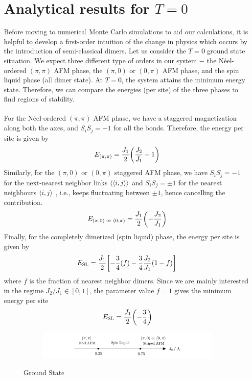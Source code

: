 \documentclass[../thesis_main.tex]{subfiles}
\begin{document}
\section{Analytical results for $T=0$} \label{t=0}
Before moving to numerical Monte Carlo simulations to aid our calculations, it is helpful to develop a first-order intuition of the change in physics which occurs by the introduction of semi-classical dimers.
Let us consider the $T = 0$ ground state situation. We expect three different type of orders in our system $-$ the Néel-ordered $(\pi, \pi)$ AFM phase, the $(\pi, 0)$ or $(0, \pi)$ AFM phase, and the spin liquid phase (all dimer state). At $T = 0$, the system attains the minimum energy state. Therefore, we can compare the energies (per site) of the three phases to find regions of stability.~\\~\\
For the Néel-ordered $(\pi, \pi)$ AFM phase, we have a staggered magnetization along both the axes, and $S_i S_j = - 1$ for all the bonds. Therefore, the energy per site is given by
\begin{equation}
    E_{(\pi, \pi)} = \frac{J_1}{2} \qty(\frac{J_2}{J_1} - 1)
\end{equation}
Similarly, for the $(\pi, 0)$ or $(0, \pi)$ staggered AFM phase, we have $S_i S_j = -1$ for the next-nearest neighbor links $\expval{\expval{i, j}}$ and $S_i S_j = \pm 1$ for the nearest neighbours $\expval{i, j}$ , i.e., keeps fluctuating between $\pm 1$, hence cancelling the contribution.
\begin{equation}
    E_{(\pi, 0) \text{ or } (0, \pi)} = \frac{J_1}{2}\qty(-\frac{J_2}{J_1})
\end{equation} 
Finally, for the completely dimerized (spin liquid) phase, the energy per site is given by
\begin{equation*}
    E_{\text{SL}} = \frac{J_1}{2} \qty[-\frac{3}{4}(f) - \frac{3}{4}\frac{J_2}{J_1}(1-f)]
\end{equation*}
where $f$ is the fraction of nearest neighbor dimers. Since we are mainly interested in the regime $J_2/J_1 \in [0, 1]$, the parameter value $f = 1$ gives the minimum energy per site
\begin{equation}
    E_{\text{SL}} = \frac{J_1}{2} \qty(-\frac{3}{4})
\end{equation}
\begin{figure}[t!]
    \centering
    \begin{subfigure}[b]{1.0\textwidth}  %
        \begin{center}
            \includegraphics[width=\textwidth]{images/j1-j2/classical-expectation.pdf}
        \end{center}
    \end{subfigure}
    \caption{Ground State}
    \label{}
\end{figure}
\end{document}
